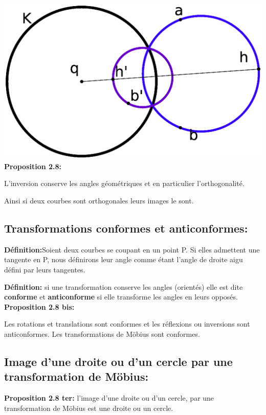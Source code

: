 \documentclass[a4paper, 12pt, twoside]{book}
\begin{document}
  \includegraphics[scale=0.7]{figures/mobius4.eps} \\
  
  
  
 \newpage  \textbf{Proposition 2.8:} \
  
  L'inversion conserve les angles géométriques et en particulier l'orthogonalité.\
  
  Ainsi si deux courbes sont orthogonales leurs images le sont.\subsection{Transformations conformes et anticonformes:}
  
  \textbf{Définition:}Soient deux courbes se coupant en un point P. Si elles admettent une tangente en P, nous définirons leur angle comme étant l'angle de droite aigu défini par leurs tangentes. 
  
  \textbf{Définition:} si une transformation conserve les angles (orientés) elle est dite \textbf{conforme} et \textbf{anticonforme} si elle transforme les angles en leurs opposés.\\
  
  
 \textbf{Proposition 2.8 bis:} \
 
 Les rotations et translations sont conformes et les réflexions ou inversions sont anticonformes. Les transformations de Möbius sont conformes.
  
\subsection{Image d'une droite ou d'un 
cercle par une transformation de Möbius:}
    
 \textbf{Proposition 2.8 ter:} l'image d'une droite ou d'un cercle, par une transformation  de Möbius est une droite ou un cercle.\\
 
\end{document}
